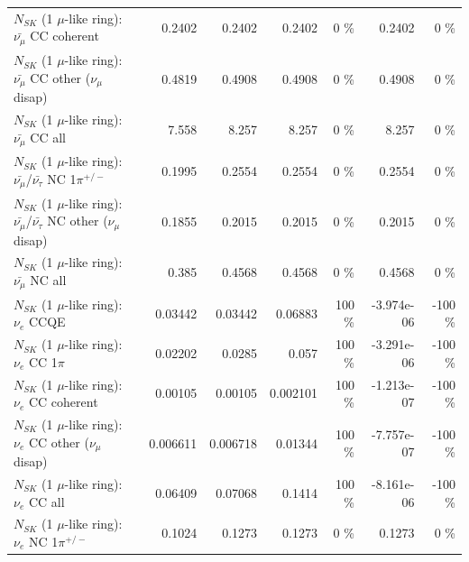 \begin{table}
\begin{tabular}{| l | r | r | r  r | r  r |}
                       $N_{SK}$ (1 $\mu$-like ring): $\bar{\nu_\mu}$ CC coherent &          0.2402 &          0.2402 &          0.2402 &        0 \%  &          0.2402 &        0 \%  \\ 
        $N_{SK}$ (1 $\mu$-like ring): $\bar{\nu_\mu}$ CC other ($\nu_\mu$ disap) &          0.4819 &          0.4908 &          0.4908 &        0 \%  &          0.4908 &        0 \%  \\ 
                          $N_{SK}$ (1 $\mu$-like ring): $\bar{\nu_{\mu}}$ CC all &           7.558 &           8.257 &           8.257 &        0 \%  &           8.257 &        0 \%  \\ 
\hline
  $N_{SK}$ (1 $\mu$-like ring): $\bar{\nu_\mu}$/$\bar{\nu_\tau}$ NC 1$\pi^{+/-}$ &          0.1995 &          0.2554 &          0.2554 &        0 \%  &          0.2554 &        0 \%  \\ 
$N_{SK}$ (1 $\mu$-like ring): $\bar{\nu_\mu}$/$\bar{\nu_\tau}$ NC other ($\nu_\mu$ disap) &          0.1855 &          0.2015 &          0.2015 &        0 \%  &          0.2015 &        0 \%  \\ 
                          $N_{SK}$ (1 $\mu$-like ring): $\bar{\nu_{\mu}}$ NC all &           0.385 &          0.4568 &          0.4568 &        0 \%  &          0.4568 &        0 \%  \\ 
\hline
\hline
\hline
                                      $N_{SK}$ (1 $\mu$-like ring): $\nu_e$ CCQE &         0.03442 &         0.03442 &         0.06883 &      100 \%  &      -3.974e-06 &     -100 \%  \\ 
                                 $N_{SK}$ (1 $\mu$-like ring): $\nu_e$ CC 1$\pi$ &         0.02202 &          0.0285 &           0.057 &      100 \%  &      -3.291e-06 &     -100 \%  \\ 
                               $N_{SK}$ (1 $\mu$-like ring): $\nu_e$ CC coherent &         0.00105 &         0.00105 &        0.002101 &      100 \%  &      -1.213e-07 &     -100 \%  \\ 
                $N_{SK}$ (1 $\mu$-like ring): $\nu_e$ CC other ($\nu_\mu$ disap) &        0.006611 &        0.006718 &         0.01344 &      100 \%  &      -7.757e-07 &     -100 \%  \\ 
                                  $N_{SK}$ (1 $\mu$-like ring): $\nu_{e}$ CC all &         0.06409 &         0.07068 &          0.1414 &      100 \%  &      -8.161e-06 &     -100 \%  \\ 
\hline
                           $N_{SK}$ (1 $\mu$-like ring): $\nu_e$ NC 1$\pi^{+/-}$ &          0.1024 &          0.1273 &          0.1273 &        0 \%  &          0.1273 &        0 \%  \\ 

\end{tabular}
\end{table}
